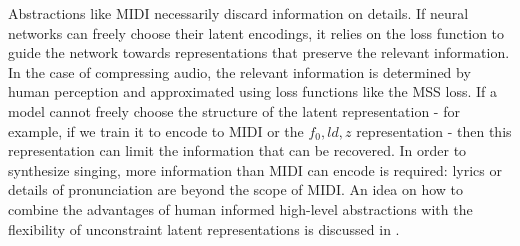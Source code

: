 Abstractions like MIDI necessarily discard information on details. If neural networks can freely choose their latent encodings, it relies on the loss function to guide the network towards representations that preserve the relevant information. In the case of compressing audio, the relevant information is determined by human perception and approximated using loss functions like the MSS loss. If a model cannot freely choose the structure of the latent representation - for example, if we train it to encode to MIDI or the $f_0, ld, z$ representation - then this representation can limit the information that can be recovered. In order to synthesize singing, more information than MIDI can encode is required: lyrics or details of pronunciation are beyond the scope of MIDI. An idea on how to combine the advantages of human informed high-level abstractions with the flexibility of unconstraint latent representations is discussed in .
\newline


